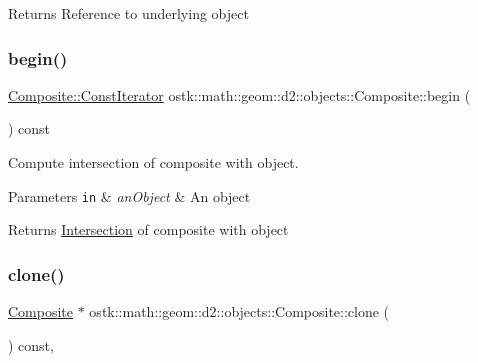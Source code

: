 \begin{DoxyReturn}{Returns}
Reference to underlying object 
\end{DoxyReturn}
\mbox{\label{classostk_1_1math_1_1geom_1_1d2_1_1objects_1_1_composite_a4b1028adfa28cad841205e46ee778fcb}} 
\subsubsection{\texorpdfstring{begin()}{begin()}}
{\footnotesize\ttfamily \hyperlink{classostk_1_1math_1_1geom_1_1d2_1_1objects_1_1_composite_a848b806da9977737e1b100c1b51b39d9}{Composite\+::\+Const\+Iterator} ostk\+::math\+::geom\+::d2\+::objects\+::\+Composite\+::begin (\begin{DoxyParamCaption}{ }\end{DoxyParamCaption}) const}



Compute intersection of composite with object. 


\begin{DoxyParams}[1]{Parameters}
\mbox{\tt in}  & {\em an\+Object} & An object \\
\hline
\end{DoxyParams}
\begin{DoxyReturn}{Returns}
\hyperlink{classostk_1_1math_1_1geom_1_1d2_1_1_intersection}{Intersection} of composite with object 
\end{DoxyReturn}
\mbox{\label{classostk_1_1math_1_1geom_1_1d2_1_1objects_1_1_composite_a24c81b4b2b2455338590c0ae94fb0f5e}} 
\subsubsection{\texorpdfstring{clone()}{clone()}}
{\footnotesize\ttfamily \hyperlink{classostk_1_1math_1_1geom_1_1d2_1_1objects_1_1_composite}{Composite} $\ast$ ostk\+::math\+::geom\+::d2\+::objects\+::\+Composite\+::clone (\begin{DoxyParamCaption}{ }\end{DoxyParamCaption}) const\hspace{0.3cm}{\ttfamily [override]}, {\ttfamily [virtual]}}



